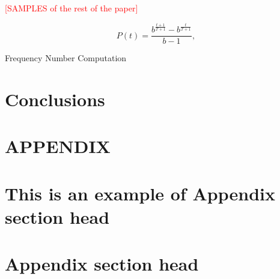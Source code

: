 \documentclass[prodmode,acmtecs]{acmsmall} %
\newcommand{\Fix}[1]{\textcolor{red}{[#1]}}
\begin{document}













\Fix{\large SAMPLES of the rest of the paper}


\begin{equation}
\label{eqn:01}
P(t)=\frac{b^{\frac{t+1}{T+1}}-b^{\frac{t}{T+1}}}{b-1},
\end{equation}

\begin{algorithm}[t]
\SetAlgoNoLine
{}
\caption{Frequency Number Computation}
\label{alg:one}
\end{algorithm}


\section{Conclusions}


\appendix
\section*{APPENDIX}
\setcounter{section}{1}

\begin{acks}
	\cite{Editor00}
\end{acks}





\elecappendix

\medskip

\section{This is an example of Appendix section head}


\section{Appendix section head}
\end{document}
